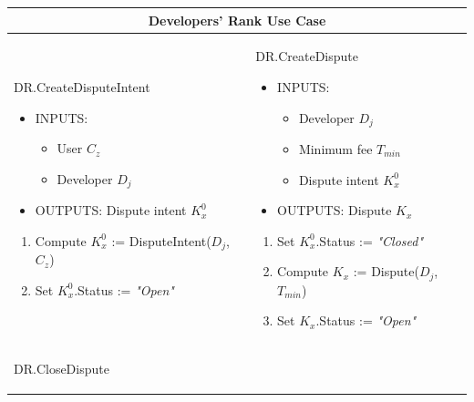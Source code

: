 \begin{table}[H]
\scriptsize
\centering
\begin{tabular}{|p{}p{}|}
\hline
\multicolumn{2}{|c|}{Developers' Rank Use Case} \\
\hline \vspace{0.1cm}
\textsf{DR.CreateDisputeIntent}
\vspace{-0.3cm}
\begin{itemize}
	\item INPUTS:
	\vspace{-0.3cm}
	\begin{itemize}
		\item User $C_z$
		\item Developer $D_j$
	\end{itemize}
	\item OUTPUTS: Dispute intent $K^{0}_{x}$
\end{itemize}
\begin{enumerate}
	\item Compute $K^{0}_{x}$ := \textsf{DisputeIntent}($D_j$, $C_z$)
	\item Set $K^{0}_{x}$.Status := \textit{"Open"}
\end{enumerate} & \vspace{0.1cm}
\textsf{DR.CreateDispute}
\vspace{-0.3cm}
\begin{itemize}
	\item INPUTS:
	\vspace{-0.3cm}
	\begin{itemize}
		\item Developer $D_j$
		\item Minimum fee $T_{min}$
		\item Dispute intent $K^{0}_{x}$
	\end{itemize}
	\item OUTPUTS: Dispute $K_x$
\end{itemize}
\begin{enumerate}
	\item Set $K^{0}_{x}$.Status := \textit{"Closed"}
	\item Compute $K_x$ := \textsf{Dispute}($D_j$, $T_{min}$)
	\item Set $K_x$.Status := \textit{"Open"}
\end{enumerate} \\ \vspace{0.1cm}
\textsf{DR.CloseDispute} 
\vspace{-0.3cm}
\begin{itemize}

\end{itemize}
\end{tabular}
\end{table}
